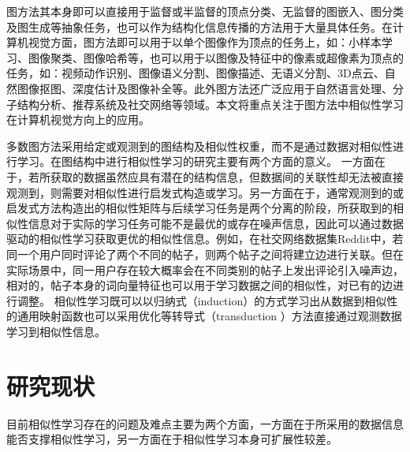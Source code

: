 图方法其本身即可以直接用于监督或半监督的顶点分类\cite{kipf2016semi,velivckovic2017graph,hamilton2017inductive}、无监督的图嵌入\cite{roweis2000nonlinear,belkin2001laplacian,perozzi2014deepwalk,kipf2016variational}、图分类\cite{shervashidze2011weisfeiler,defferrard2016convolutional,zhang2018end,xu2018how}及图生成\cite{simonovsky2018graphvae,de2018molgan,li2018learning}等抽象任务，也可以作为结构化信息传播的方法用于大量具体任务。在计算机视觉方面，图方法即可以用于以单个图像作为顶点的任务上，如：小样本学习\cite{garcia2018fewshot}、图像聚类\cite{blaschko2008correlational}、图像哈希\cite{weiss2009spectral}等，也可以用于以图像及特征中的像素或超像素为顶点的任务，如：视频动作识别\cite{wang2018non}、图像语义分割\cite{huang2019interlaced}、图像描述\cite{yao2018exploring}、无语义分割\cite{shi2000normalized}、3D点云\cite{wang2019dynamic}、自然图像抠图\cite{levin2008closed}、深度估计\cite{cheng2018depth}及图像补全\cite{yu2018generative}等。此外图方法还广泛应用于自然语言处理\cite{vaswani2017attention}、分子结构分析\cite{kearnes2016molecular}、推荐系统\cite{ying2018graph}及社交网络\cite{hamilton2017inductive}等领域。本文将重点关注于图方法中相似性学习在计算机视觉方向上的应用。


多数图方法采用给定或观测到的图结构及相似性权重，而不是通过数据对相似性进行学习。在图结构中进行相似性学习的研究主要有两个方面的意义。
一方面在于，若所获取的数据虽然应具有潜在的结构信息，但数据间的关联性却无法被直接观测到，则需要对相似性进行启发式构造或学习。另一方面在于，通常观测到的或启发式方法构造出的相似性矩阵与后续学习任务是两个分离的阶段，所获取到的相似性信息对于实际的学习任务可能不是最优的或存在噪声信息，因此可以通过数据驱动的相似性学习获取更优的相似性信息。例如，在社交网络数据集Reddit\cite{hamilton2017inductive}中，若同一个用户同时评论了两个不同的帖子，则两个帖子之间将建立边进行关联。但在实际场景中，同一用户存在较大概率会在不同类别的帖子上发出评论引入噪声边，相对的，帖子本身的词向量特征也可以用于学习数据之间的相似性，对已有的边进行调整。
相似性学习既可以以归纳式（induction）的方式学习出从数据到相似性的通用映射函数\cite{meila2001learning}也可以采用优化等转导式（transduction ）方法直接通过观测数据学习到相似性信息\cite{nie2014clustering}。

\section{研究现状}

目前相似性学习存在的问题及难点主要为两个方面，一方面在于所采用的数据信息能否支撑相似性学习，另一方面在于相似性学习本身可扩展性较差。

